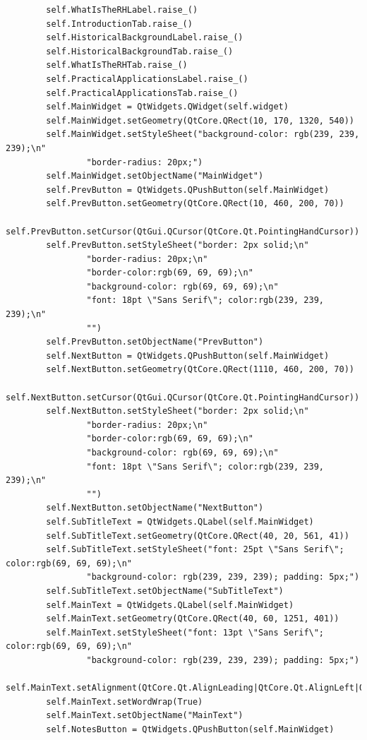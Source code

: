 \documentclass{article}
\begin{document}
\begin{lstlisting}
        self.WhatIsTheRHLabel.raise_()
        self.IntroductionTab.raise_()
        self.HistoricalBackgroundLabel.raise_()
        self.HistoricalBackgroundTab.raise_()
        self.WhatIsTheRHTab.raise_()
        self.PracticalApplicationsLabel.raise_()
        self.PracticalApplicationsTab.raise_()
        self.MainWidget = QtWidgets.QWidget(self.widget)
        self.MainWidget.setGeometry(QtCore.QRect(10, 170, 1320, 540))
        self.MainWidget.setStyleSheet("background-color: rgb(239, 239, 239);\n"
                "border-radius: 20px;")
        self.MainWidget.setObjectName("MainWidget")
        self.PrevButton = QtWidgets.QPushButton(self.MainWidget)
        self.PrevButton.setGeometry(QtCore.QRect(10, 460, 200, 70))
        self.PrevButton.setCursor(QtGui.QCursor(QtCore.Qt.PointingHandCursor))
        self.PrevButton.setStyleSheet("border: 2px solid;\n"
                "border-radius: 20px;\n"
                "border-color:rgb(69, 69, 69);\n"
                "background-color: rgb(69, 69, 69);\n"
                "font: 18pt \"Sans Serif\"; color:rgb(239, 239, 239);\n"
                "")
        self.PrevButton.setObjectName("PrevButton")
        self.NextButton = QtWidgets.QPushButton(self.MainWidget)
        self.NextButton.setGeometry(QtCore.QRect(1110, 460, 200, 70))
        self.NextButton.setCursor(QtGui.QCursor(QtCore.Qt.PointingHandCursor))
        self.NextButton.setStyleSheet("border: 2px solid;\n"
                "border-radius: 20px;\n"
                "border-color:rgb(69, 69, 69);\n"
                "background-color: rgb(69, 69, 69);\n"
                "font: 18pt \"Sans Serif\"; color:rgb(239, 239, 239);\n"
                "")
        self.NextButton.setObjectName("NextButton")
        self.SubTitleText = QtWidgets.QLabel(self.MainWidget)
        self.SubTitleText.setGeometry(QtCore.QRect(40, 20, 561, 41))
        self.SubTitleText.setStyleSheet("font: 25pt \"Sans Serif\"; color:rgb(69, 69, 69);\n"
                "background-color: rgb(239, 239, 239); padding: 5px;")
        self.SubTitleText.setObjectName("SubTitleText")
        self.MainText = QtWidgets.QLabel(self.MainWidget)
        self.MainText.setGeometry(QtCore.QRect(40, 60, 1251, 401))
        self.MainText.setStyleSheet("font: 13pt \"Sans Serif\"; color:rgb(69, 69, 69);\n"
                "background-color: rgb(239, 239, 239); padding: 5px;")
        self.MainText.setAlignment(QtCore.Qt.AlignLeading|QtCore.Qt.AlignLeft|QtCore.Qt.AlignTop)
        self.MainText.setWordWrap(True)
        self.MainText.setObjectName("MainText")
        self.NotesButton = QtWidgets.QPushButton(self.MainWidget)

\end{lstlisting}
\end{document}
